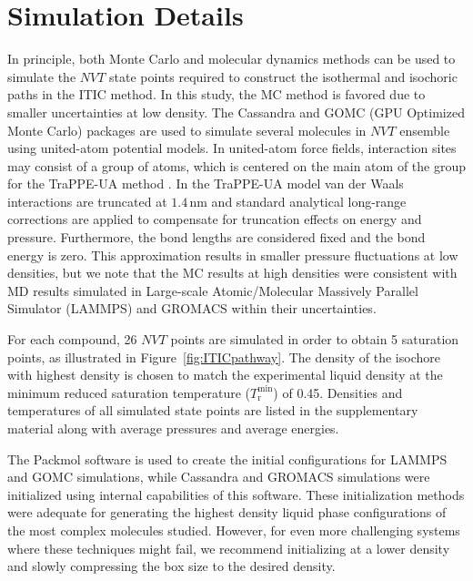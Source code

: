 \documentclass[5p,times]{elsarticle}
\begin{document}
\section{Simulation Details} \label{sec:SimDetail}
In principle, both Monte Carlo and molecular dynamics methods can be used to simulate the $NVT$ state points required to construct the isothermal and isochoric paths in the ITIC method. In this study, the MC method is favored due to smaller uncertainties at low density. The Cassandra \cite{Shah2017} and GOMC (GPU Optimized Monte Carlo) \cite{Mick2013} packages are used to simulate several molecules in $NVT$ ensemble using united-atom potential models. In united-atom force fields, interaction sites may consist of a group of atoms, which is centered on the main atom of the group for the TraPPE-UA method \cite{Smit1998}. In the TraPPE-UA model van der Waals interactions are truncated at $1.4\,\mathrm{nm}$ and standard analytical long-range corrections are applied to compensate for truncation effects on energy and pressure\cite{allen2017}. Furthermore, the bond lengths are considered fixed and the bond energy is zero. This approximation results in smaller pressure fluctuations at low densities, but we note that the MC results at high densities were consistent with MD results simulated in Large-scale Atomic/Molecular Massively Parallel Simulator (LAMMPS) \cite{Plimpton2007} and GROMACS \cite{Lindahl2001} within their uncertainties.

For each compound, 26 $NVT$ points are simulated in order to obtain 5 saturation points, as illustrated in Figure~\ref{fig:ITICpathway}. The density of the isochore with highest density is chosen to match the experimental liquid density at the minimum reduced saturation temperature ($T_\mathrm{r}^\mathrm{min}$) of 0.45. Densities and temperatures of all simulated state points are listed in the supplementary material along with average pressures and average energies.

The Packmol \cite{martinez2009packmol} software is used to create the initial configurations for LAMMPS and GOMC simulations, while Cassandra and GROMACS simulations were initialized using internal capabilities of this software. These initialization methods were adequate for generating the highest density liquid phase configurations of the most complex molecules studied. However, for even more challenging systems where these techniques might fail, we recommend initializing at a lower density and slowly compressing the box size to the desired density. 
\end{document}
